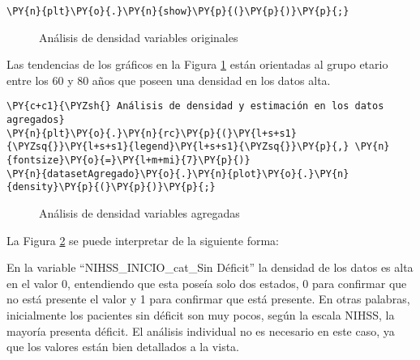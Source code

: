 \begin{tcolorbox}[breakable, size=fbox, boxrule=1pt, pad at break*=1mm,colback=cellbackground, colframe=cellborder]
\begin{Verbatim}[commandchars=\\\{\}]
\PY{n}{plt}\PY{o}{.}\PY{n}{show}\PY{p}{(}\PY{p}{)}\PY{p}{;}
\end{Verbatim}
\end{tcolorbox}


\begin{center}
    	\begin{figure}[H]
	\centering
	\caption{Análisis de densidad variables originales}
	\label{fig:advo}
	\end{figure}
\end{center}
    
    Las tendencias de los gráficos en la Figura \ref{fig:advo} están orientadas al grupo etario entre los 60 y 80 años que poseen una densidad en los datos alta.

    \begin{tcolorbox}[breakable, size=fbox, boxrule=1pt, pad at break*=1mm,colback=cellbackground, colframe=cellborder]
\begin{Verbatim}[commandchars=\\\{\}]
\PY{c+c1}{\PYZsh{} Análisis de densidad y estimación en los datos agregados}
\PY{n}{plt}\PY{o}{.}\PY{n}{rc}\PY{p}{(}\PY{l+s+s1}{\PYZsq{}}\PY{l+s+s1}{legend}\PY{l+s+s1}{\PYZsq{}}\PY{p}{,} \PY{n}{fontsize}\PY{o}{=}\PY{l+m+mi}{7}\PY{p}{)}
\PY{n}{datasetAgregado}\PY{o}{.}\PY{n}{plot}\PY{o}{.}\PY{n}{density}\PY{p}{(}\PY{p}{)}\PY{p}{;}
\end{Verbatim}
\end{tcolorbox}

\begin{center}
    	\begin{figure}[H]
	\centering
	\caption{Análisis de densidad variables agregadas}
	\label{fig:adva}
	\end{figure}
\end{center}
    
    La Figura \ref{fig:adva} se puede interpretar de la siguiente forma: 
\par En la variable ``NIHSS\_INICIO\_cat\_Sin Déficit'' la densidad de los datos es alta en el valor 0, entendiendo que esta poseía solo dos estados, 0 para confirmar que no está presente el valor y 1 para confirmar que está presente. En otras palabras, inicialmente los pacientes sin déficit son muy pocos, según la escala NIHSS, la mayoría presenta déficit. El análisis individual no es necesario en este caso, ya que los valores están bien detallados a la vista.

